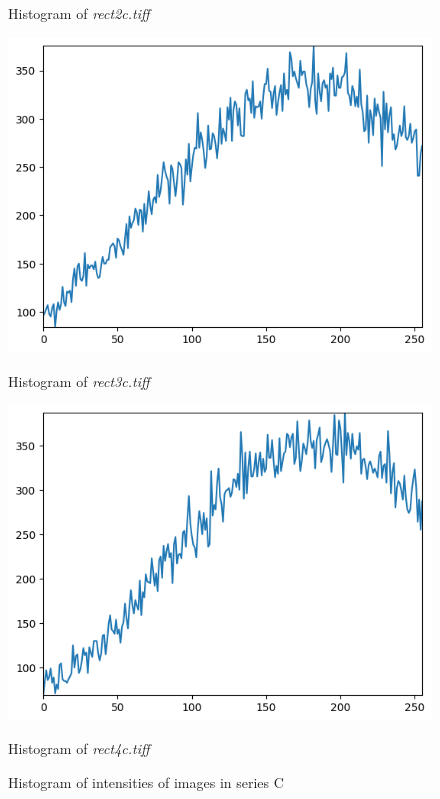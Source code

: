 \documentclass[runningheads]{llncs}
\begin{document}
\begin{figure}[h!]
\begin{minipage}[h]{0.47\linewidth}
\begin{center}
\caption{Histogram of \emph{rect2c.tiff}}
\label{Histogram-2c}
\end{center}
\end{minipage}
\vfill
\vspace{0.2 cm}
\begin{minipage}[h]{0.47\linewidth}
\begin{center}
\includegraphics[width=1\linewidth]{Report/Result_Images/histogram_3c.png} 
\caption{Histogram of \emph{rect3c.tiff}}
\label{Histogram-3c}
\end{center}
\end{minipage}
\hfill
\begin{minipage}[h]{0.47\linewidth}
\begin{center}
\includegraphics[width=1\linewidth]{Report/Result_Images/histogram_4c.png} 
\caption{Histogram of \emph{rect4c.tiff}}
\label{Histogram-4c}
\end{center}
\end{minipage}
\caption*{Histogram of intensities of images in series C}
\label{Histogram-C_Series}
\end{figure}
\end{document}
